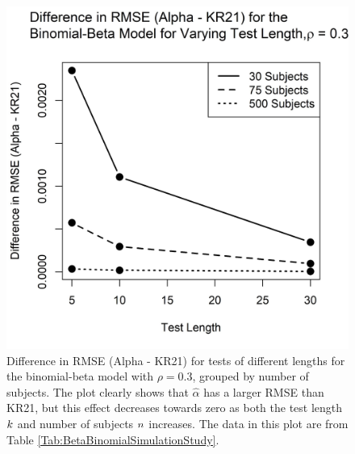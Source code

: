 \documentclass[12pt,epsfig]{article}
\newcommand{\changed}[1]{\textcolor{black}{#1}}
\newcommand{\numsubjects}{\changed{n}}%
\newcommand{\testlength}{\changed{k}}%
\begin{document}
\begin{figure}[ht] \centering
\includegraphics{BBPlot}
\caption{\color{black} Difference in RMSE (Alpha - KR21) for tests of different lengths for the binomial-beta model with $\rho = 0.3$, grouped by number of subjects. The plot clearly shows that $\hat{\alpha}$ has a larger RMSE than KR21, but this effect decreases towards zero as both the test length $\testlength$ and number of subjects $\numsubjects$ increases. The data in this plot are from Table \ref{Tab:BetaBinomialSimulationStudy}.}
\label{Fig:BBPlot}
\end{figure}




\clearpage

%
\end{document}
